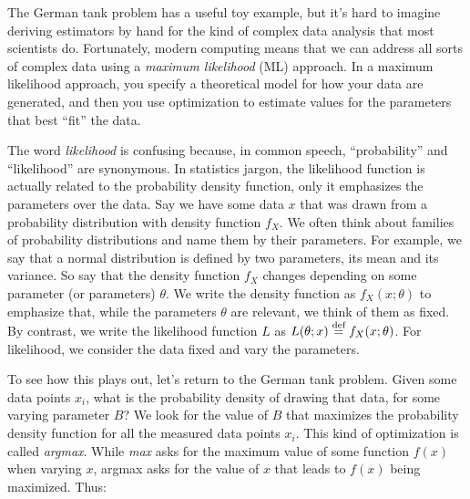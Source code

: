 The German tank problem has a useful toy example, but it's hard to imagine deriving
estimators by hand for the kind of complex data analysis that most scientists do.
Fortunately, modern computing means that we can address all sorts of complex data
using a \emph{maximum likelihood} (ML) approach. In a maximum likelihood approach, you
specify a theoretical model for how your data are generated, and then you use optimization to estimate values for the parameters that best ``fit'' the data.

The word \emph{likelihood} is confusing because, in common speech, ``probability''
and ``likelihood'' are synonymous. In statistics jargon, the likelihood function
is actually related to the probability density function, only it emphasizes the
parameters over the data. Say we have some data $x$ that was drawn from a probability 
distribution with density function $f_X$. We often think about families of probability
distributions and name them by their parameters. For example, we say that a normal
distribution is defined by two parameters, its mean and its variance. So say that
the density function $f_X$ changes depending on some parameter (or parameters) $\theta$.
We write the density function as $f_X(x; \theta)$ to emphasize that, while the
parameters $\theta$ are relevant, we think of them as fixed. By contrast, we write
the likelihood function $L$ as $L(\theta; x) \stackrel{\text{def}}{=} f_X(x; \theta)$. For likelihood,
we consider the data fixed and vary the parameters.

To see how this plays out, let's return to the German tank problem. Given some data
points $x_i$, what is the probability density of drawing that data, for some varying
parameter $B$? We look for the value of $B$ that maximizes the probability density
function for all the measured data points $x_i$. This kind of optimization is called \emph{argmax}. While \emph{max} asks for the maximum value of some function $f(x)$ when varying $x$, argmax asks for the value of $x$ that leads to $f(x)$ being maximized. Thus:

